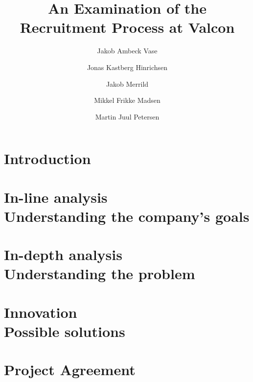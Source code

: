 \documentclass[hidelinks, a4paper]{report}
\begin{document}
\title{An Examination of the Recruitment Process at Valcon}
\author{Jakob Ambeck Vase \and Jonas Kastberg Hinrichsen \and Jakob Merrild \and Mikkel Frikke Madsen \and Martin Juul Petersen}

\maketitle
\tableofcontents

\chapter{Introduction}

\chapter{In-line analysis \\ Understanding the company's goals}

\chapter{In-depth analysis \\ Understanding the problem}

\chapter{Innovation \\ Possible solutions}


\appendix
\chapter{Project Agreement}

\end{document}

